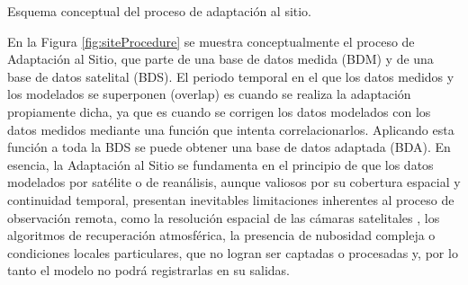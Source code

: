 \documentclass[letterpaper,12pt, twoside]{report}
\providecommand{\DIFdeltex}[1]{{\protect\color{red} \scriptsize #1}} %
\providecommand{\DIFdelFL}[1]{\DIFdel{#1}} %
\providecommand{\DIFdel}[1]{\texorpdfstring{\DIFdeltex{#1}}{}} %
\begin{document}
{%
\DIFdelFL{Esquema conceptual del proceso de adaptación al sitio.}}

\DIFdel{En la Figura \ref{fig:siteProcedure} se muestra conceptualmente el proceso de Adaptación al Sitio, que parte de una base de datos medida (BDM) y de una base de datos satelital (BDS). El periodo temporal en el que los datos medidos y los modelados se superponen (overlap) es cuando se realiza la adaptación propiamente dicha, ya que es cuando se corrigen los datos modelados con los datos medidos mediante una función que intenta correlacionarlos. Aplicando esta función a toda la BDS se puede obtener una base de datos adaptada (BDA).
En esencia, la Adaptación al Sitio se fundamenta en el principio de que los datos modelados por satélite o de reanálisis, aunque valiosos por su cobertura espacial y continuidad temporal, presentan inevitables limitaciones inherentes al proceso de observación remota, como la resolución espacial de las cámaras satelitales , los algoritmos de recuperación atmosférica, la presencia de nubosidad compleja o condiciones locales particulares, que no logran ser captadas o procesadas y, por lo tanto el modelo no podrá registrarlas en su salidas.}%
\end{document}
